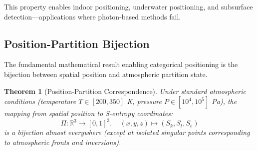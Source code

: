 \documentclass[twocolumn,10pt,a4paper]{article}
\newtheorem{theorem}{Theorem}[section]
\theoremstyle{definition}
\theoremstyle{remark}
\begin{document}
This property enables indoor positioning, underwater positioning, and subsurface detection—applications where photon-based methods fail.

\subsection{Position-Partition Bijection}

The fundamental mathematical result enabling categorical positioning is the bijection between spatial position and atmospheric partition state.

\begin{theorem}[Position-Partition Correspondence]
\label{thm:bijection}
Under standard atmospheric conditions (temperature $T \in [200, 350]$ K, pressure $P \in [10^4, 10^5]$ Pa), the mapping from spatial position to S-entropy coordinates:
\begin{equation}
    \Pi: \mathbb{R}^3 \to [0,1]^3, \quad (x, y, z) \mapsto (S_k, S_t, S_e)
\end{equation}
is a bijection almost everywhere (except at isolated singular points corresponding to atmospheric fronts and inversions).
\end{theorem}
\end{document}

